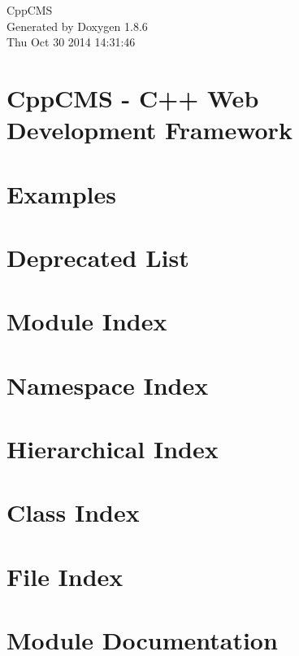 \documentclass[twoside]{book}
\newcommand{\clearemptydoublepage}{%
  \newpage{\pagestyle{empty}\cleardoublepage}%
}
\begin{document}
\begin{titlepage}
\vspace*{7cm}
\begin{center}%
{\Large Cpp\-C\-M\-S }\\
\vspace*{1cm}
{\large Generated by Doxygen 1.8.6}\\
\vspace*{0.5cm}
{\small Thu Oct 30 2014 14:31:46}\\
\end{center}
\end{titlepage}
\clearemptydoublepage
\tableofcontents
\clearemptydoublepage
{}

\chapter{Cpp\-C\-M\-S -\/ C++ Web Development Framework}
\label{index}
\chapter{Examples}
\label{examples_page}

\chapter{Deprecated List}
\label{deprecated}

\chapter{Module Index}

\chapter{Namespace Index}

\chapter{Hierarchical Index}

\chapter{Class Index}

\chapter{File Index}

\chapter{Module Documentation}







\end{document}
